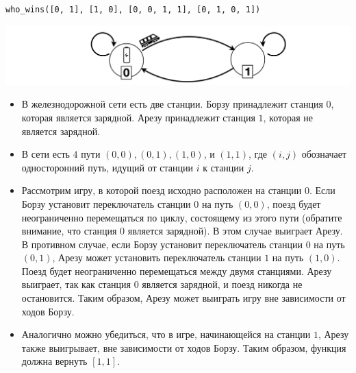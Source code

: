 \texttt{who\_wins([0, 1], [1, 0], [0, 0, 1, 1], [0, 1, 0, 1])}

\includegraphics{train.png}

\begin{itemize}
\item В железнодорожной сети есть две станции. Борзу принадлежит станция $0$, которая
является зарядной. Арезу принадлежит станция $1$, которая не является зарядной.
\item В сети есть $4$ пути $(0, 0), (0, 1), (1, 0)$, и $(1, 1)$, где $(i, j)$ обозначает односторонний путь, идущий от станции $i$ к станции $j$.
\item Рассмотрим игру, в которой поезд исходно расположен на станции $0$.
Если Борзу установит переключатель станции $0$ на путь $(0, 0)$, поезд будет неограниченно
перемещаться по циклу, состоящему из этого пути (обратите внимание, что станция $0$ является зарядной). В этом случае выиграет Арезу. В противном случае, если Борзу
установит переключатель станции $0$ на путь $(0, 1)$, Арезу может установить
переключатель станции $1$ на путь $(1, 0)$. Поезд будет неограниченно перемещаться
между двумя станциями. Арезу выиграет, так как станция $0$ является зарядной, и поезд никогда не остановится. Таким образом, Арезу может выиграть игру вне зависимости от
ходов Борзу.
\item Аналогично можно убедиться, что в игре, начинающейся на станции $1$, Арезу также
выигрывает, вне зависимости от ходов Борзу. Таким образом, функция должна вернуть $[1, 1]$.
\end{itemize}
